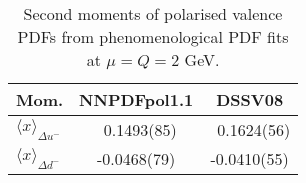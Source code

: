 \begin{table}[!t]
\centering
\footnotesize
\begin{tabular}{lcc}
\toprule
Mom. & NNPDFpol1.1 & DSSV08 \\
\midrule
$\langle x\rangle_{\Delta u^-}$ 
& \ 0.1493(85) & \ 0.1624(56) \\
$\langle x\rangle_{\Delta d^-}$ 
&  -0.0468(79) &  -0.0410(55) \\
\bottomrule
\end{tabular}
\caption{\small Second moments of polarised valence PDFs from phenomenological PDF fits
at $\mu=Q=2$ GeV.}
\label{tab:polHmoms}
\end{table}
